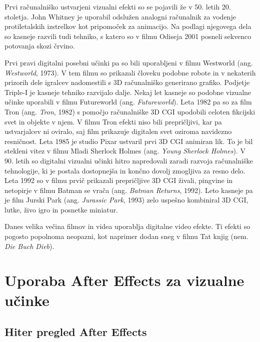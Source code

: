 \documentclass[a4paper, 12pt]{book}
\begin{document}
Prvi računalniško ustvarjeni vizualni efekti so se pojavili že v 50. letih 20. stoletja. 
John Whitney je uporabil odslužen analogni računalnik za vodenje protiletalskih izstrelkov kot pripomoček za animacijo. 
Na podlagi njegovega dela so kasneje razvili tudi tehniko, s katero so v filmu Odiseja 2001 posneli sekvenco potovanja skozi črvino.

Prvi pravi digitalni posebni učinki pa so bili uporabljeni v filmu Westworld (ang. {\it Westworld}, 1973). %
V tem filmu so prikazali človeku podobne robote in v nekaterih prizorih dele igralcev nadomestili s 3D računalniško generirano grafiko. 
Podjetje Triple-I je kasneje tehniko razvijalo dalje.
Nekaj let kasneje so podobne vizualne učinke uporabili v filmu Futureworld (ang. {\it Futureworld}).
Leta 1982 pa so za film Tron (ang. {\it Tron}, 1982) s pomočjo računalniške 3D CGI upodobili celoten fikcijski svet in objekte v njem.
V filmu Tron efekti niso bili prepričljivi, kar pa ustvarjalcev ni oviralo, saj film prikazuje digitalen svet oziroma navidezno resničnost.
Leta 1985 je studio Pixar ustvaril prvi 3D CGI animiran lik.
To je bil stekleni vitez v filmu Mladi Sherlock Holmes (ang. {\it Young Sherlock Holmes}).
V 90. letih so digitalni vizualni učinki hitro napredovali zaradi razvoja računalniške tehnologije, ki je postala dostopnejša in končno dovolj zmogljiva za resno delo.
Leta 1992 so v filmu prvič prikazali prepričljive 3D CGI živali, pingvine in netopirje v filmu Batman se vrača (ang. {\it Batman Returns}, 1992). %
Leto kasneje pa je film Jurski Park (ang. {\it Jurassic Park}, 1993) zelo uspešno kombiniral 3D CGI, lutke, živo igro in posnetke miniatur. 

Danes velika večina filmov in videa uporablja digitalne video efekte. 
Ti efekti so pogosto popolnoma neopazni, kot naprimer dodan sneg v filmu Tat knjig (nem. {\it Die Buch Dieb}). %



\chapter{Uporaba After Effects za vizualne učinke}

\section{Hiter pregled After Effects}
\end{document}
